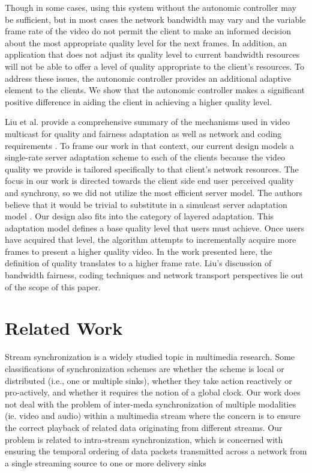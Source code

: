 \documentclass{sig-alternate}
\begin{document}
Though in some cases, using this system without the autonomic
controller may be sufficient, but in most cases the network bandwidth
may vary and the variable frame rate of the video do not permit the
client to make an informed decision about the most appropriate quality
level for the next frames.  In addition, an application that does not
adjust its quality level to current bandwidth resources will not be
able to offer a level of quality appropriate to the client's
resources.  To address these issues, the autonomic controller provides
an additional adaptive element to the clients.  We show that the
autonomic controller makes a significant positive difference in aiding
the client in achieving a higher quality level.

Liu et al. provide a comprehensive summary of the mechanisms used in
video multicast for quality and fairness adaptation as well as network
and coding requirements \cite{LIU}.  To frame our work in that
context, our current design models a single-rate server adaptation
scheme to each of the clients because the video quality we provide is
tailored specifically to that client's network resources.  The focus
in our work is directed towards the client side end user perceived
quality and synchrony, so we did not utilize the most efficient server
model.  The authors believe that it would be trivial to substitute in
a simulcast server adaptation model \cite{CHEUNG,LI}.  Our design also
fits into the category of layered adaptation.  This adaptation model
defines a base quality level that users must achieve.  Once users have
acquired that level, the algorithm attempts to incrementally acquire
more frames to present a higher quality video.  In the work presented
here, the definition of quality translates to a higher frame rate.
Liu's discussion of bandwidth fairness, coding techniques and network
transport perspectives lie out of the scope of this paper.

\section{Related Work} \label{related}

Stream synchronization is a widely studied topic in multimedia
research.  Some classifications of synchronization schemes are whether
the scheme is local or distributed (i.e., one or multiple sinks),
whether they take action reactively or pro-actively, and whether it
requires the notion of a global clock.  Our work does not deal with
the problem of inter-meda synchronization of multiple modalities
(ie. video and audio) within a multimedia stream where the concern is
to ensure the correct playback of related data originating from
different streams.  Our problem is related to intra-stream
synchronization, which is concerned with ensuring the temporal
ordering of data packets transmitted across a network from a single
streaming source to one or more delivery sinks
\end{document}
